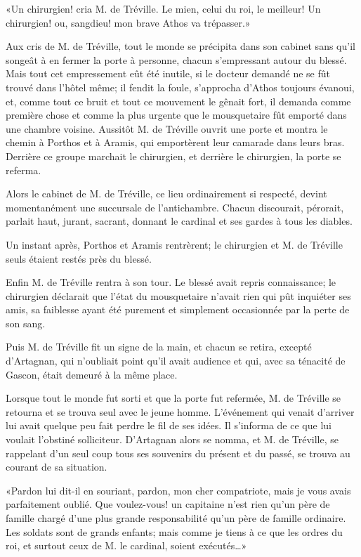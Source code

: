 «Un chirurgien! cria M. de Tréville. Le mien, celui du roi, le meilleur! Un chirurgien! ou, sangdieu! mon brave Athos va trépasser.» 

Aux cris de M. de Tréville, tout le monde se précipita dans son cabinet sans qu'il songeât à en fermer la porte à personne, chacun s'empressant autour du blessé. Mais tout cet empressement eût été inutile, si le docteur demandé ne se fût trouvé dans l'hôtel même; il fendit la foule, s'approcha d'Athos toujours évanoui, et, comme tout ce bruit et tout ce mouvement le gênait fort, il demanda comme première chose et comme la plus urgente que le mousquetaire fût emporté dans une chambre voisine. Aussitôt M. de Tréville ouvrit une porte et montra le chemin à Porthos et à Aramis, qui emportèrent leur camarade dans leurs bras. Derrière ce groupe marchait le chirurgien, et derrière le chirurgien, la porte se referma. 

Alors le cabinet de M. de Tréville, ce lieu ordinairement si respecté, devint momentanément une succursale de l'antichambre. Chacun discourait, pérorait, parlait haut, jurant, sacrant, donnant le cardinal et ses gardes à tous les diables. 

Un instant après, Porthos et Aramis rentrèrent; le chirurgien et M. de Tréville seuls étaient restés près du blessé. 

Enfin M. de Tréville rentra à son tour. Le blessé avait repris connaissance; le chirurgien déclarait que l'état du mousquetaire n'avait rien qui pût inquiéter ses amis, sa faiblesse ayant été purement et simplement occasionnée par la perte de son sang. 

Puis M. de Tréville fit un signe de la main, et chacun se retira, excepté d'Artagnan, qui n'oubliait point qu'il avait audience et qui, avec sa ténacité de Gascon, était demeuré à la même place. 

Lorsque tout le monde fut sorti et que la porte fut refermée, M. de Tréville se retourna et se trouva seul avec le jeune homme. L'événement qui venait d'arriver lui avait quelque peu fait perdre le fil de ses idées. Il s'informa de ce que lui voulait l'obstiné solliciteur. D'Artagnan alors se nomma, et M. de Tréville, se rappelant d'un seul coup tous ses souvenirs du présent et du passé, se trouva au courant de sa situation. 

«Pardon lui dit-il en souriant, pardon, mon cher compatriote, mais je vous avais parfaitement oublié. Que voulez-vous! un capitaine n'est rien qu'un père de famille chargé d'une plus grande responsabilité qu'un père de famille ordinaire. Les soldats sont de grands enfants; mais comme je tiens à ce que les ordres du roi, et surtout ceux de M. le cardinal, soient exécutés\dots» 

